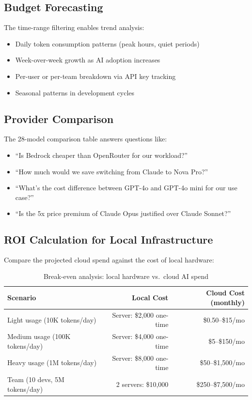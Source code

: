 \documentclass[11pt,a4paper]{article}
\begin{document}
\subsection{Budget Forecasting}

The time-range filtering enables trend analysis:

\begin{itemize}
  \item Daily token consumption patterns (peak hours, quiet periods)
  \item Week-over-week growth as AI adoption increases
  \item Per-user or per-team breakdown via API key tracking
  \item Seasonal patterns in development cycles
\end{itemize}

\subsection{Provider Comparison}

The 28-model comparison table answers questions like:

\begin{itemize}
  \item ``Is Bedrock cheaper than OpenRouter for our workload?''
  \item ``How much would we save switching from Claude to Nova Pro?''
  \item ``What's the cost difference between GPT-4o and GPT-4o mini for our use case?''
  \item ``Is the 5x price premium of Claude Opus justified over Claude Sonnet?''
\end{itemize}

\subsection{ROI Calculation for Local Infrastructure}

Compare the projected cloud spend against the cost of local hardware:

\begin{table}[H]
\centering
\begin{tabularx}{\textwidth}{Xrr}
\toprule
\textbf{Scenario} & \textbf{Local Cost} & \textbf{Cloud Cost (monthly)} \\
\midrule
Light usage (10K tokens/day) & Server: \$2,000 one-time & \$0.50--\$15/mo \\
Medium usage (100K tokens/day) & Server: \$4,000 one-time & \$5--\$150/mo \\
Heavy usage (1M tokens/day) & Server: \$8,000 one-time & \$50--\$1,500/mo \\
Team (10 devs, 5M tokens/day) & 2 servers: \$10,000 & \$250--\$7,500/mo \\
\bottomrule
\end{tabularx}
\caption{Break-even analysis: local hardware vs.\ cloud AI spend}
\end{table}
\end{document}
